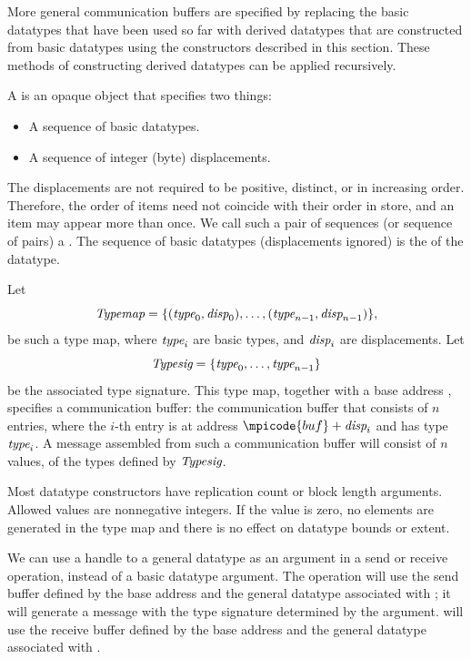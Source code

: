 More general communication buffers are specified by replacing the
basic datatypes that have been used so far with derived datatypes that
are constructed from basic datatypes using the constructors described
in this section.  These methods of constructing derived datatypes can
be applied recursively.

A  is an opaque object that specifies two
things:
\begin{itemize}
\item
A sequence of basic datatypes.
\item
A sequence of integer (byte) displacements.
\end{itemize}

The displacements are not required to be positive, distinct, or
in increasing order. Therefore, the order of items need not
coincide with their order in store, and an item may appear more than
once.
We call such a pair of sequences (or sequence of pairs) a .
The sequence of basic datatypes (displacements ignored) is the  of the datatype.

Let
\[
\textrm{\itshape{Typemap}} = \{ (\textrm{\itshape{type}}_0,\textrm{\itshape{disp}}_0), \ldots , (\textrm{\itshape{type}}_{n-1}, \textrm{\itshape{disp}}_{n-1}) \} ,
\]
be such a type map, where $\textrm{\itshape{type}}_i$ are basic types, and
$\textrm{\itshape{disp}}_i$ are  displacements.
Let
\[
\textrm{\itshape{Typesig}} = \{ \textrm{\itshape{type}}_0 , \ldots , \textrm{\itshape{type}}_{n-1} \}
\]
be the associated type signature.
This type map, together with a base address ,
specifies a communication buffer: the communication buffer that consists of $n$
entries, where the $i$-th entry is at address $\mpicode{buf} +
\mword{disp}_i$ and has type $\textrm{\itshape{type}}_i$.
A message assembled from such a
communication buffer will consist of $n$ values, of the types defined
by $\textrm{\itshape{Typesig}}$.

Most datatype constructors have replication count or block length arguments.
Allowed values are nonnegative integers. If the value is zero, no elements are
generated in the type map and there is no effect on datatype bounds or
extent.

We can use a handle to a general datatype as an argument in a send or
receive operation, instead of a basic datatype argument.  The
operation
 will use the send buffer
defined by the base address  and the general datatype
associated with ; it will generate a message with the type
signature determined by the  argument.
 will use the receive buffer
defined by the base address  and the general datatype
associated with .

